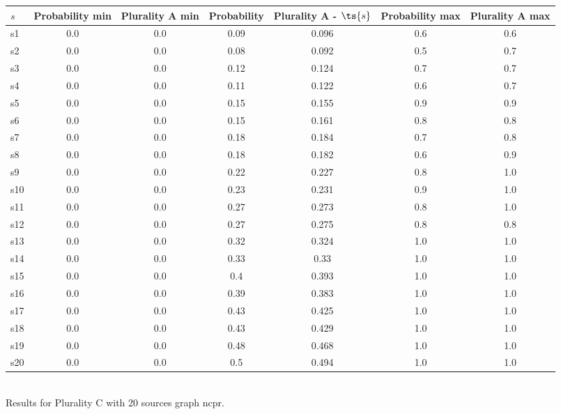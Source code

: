 \documentclass{article}
\begin{document}
\noindent\begin{tabular}{|l|c|c|c|c|c|c|}
\hline
$s$& Probability min & Plurality A min & Probability & Plurality A - $\ts{s}$ & Probability max & Plurality A max\\
\hline
s1 &0.0 & 0.0 & 0.09 & 0.096 & 0.6 & 0.6\\
\hline
s2 &0.0 & 0.0 & 0.08 & 0.092 & 0.5 & 0.7\\
\hline
s3 &0.0 & 0.0 & 0.12 & 0.124 & 0.7 & 0.7\\
\hline
s4 &0.0 & 0.0 & 0.11 & 0.122 & 0.6 & 0.7\\
\hline
s5 &0.0 & 0.0 & 0.15 & 0.155 & 0.9 & 0.9\\
\hline
s6 &0.0 & 0.0 & 0.15 & 0.161 & 0.8 & 0.8\\
\hline
s7 &0.0 & 0.0 & 0.18 & 0.184 & 0.7 & 0.8\\
\hline
s8 &0.0 & 0.0 & 0.18 & 0.182 & 0.6 & 0.9\\
\hline
s9 &0.0 & 0.0 & 0.22 & 0.227 & 0.8 & 1.0\\
\hline
s10 &0.0 & 0.0 & 0.23 & 0.231 & 0.9 & 1.0\\
\hline
s11 &0.0 & 0.0 & 0.27 & 0.273 & 0.8 & 1.0\\
\hline
s12 &0.0 & 0.0 & 0.27 & 0.275 & 0.8 & 0.8\\
\hline
s13 &0.0 & 0.0 & 0.32 & 0.324 & 1.0 & 1.0\\
\hline
s14 &0.0 & 0.0 & 0.33 & 0.33 & 1.0 & 1.0\\
\hline
s15 &0.0 & 0.0 & 0.4 & 0.393 & 1.0 & 1.0\\
\hline
s16 &0.0 & 0.0 & 0.39 & 0.383 & 1.0 & 1.0\\
\hline
s17 &0.0 & 0.0 & 0.43 & 0.425 & 1.0 & 1.0\\
\hline
s18 &0.0 & 0.0 & 0.43 & 0.429 & 1.0 & 1.0\\
\hline
s19 &0.0 & 0.0 & 0.48 & 0.468 & 1.0 & 1.0\\
\hline
s20 &0.0 & 0.0 & 0.5 & 0.494 & 1.0 & 1.0\\
\hline
\end{tabular}\\

\noindent Results for Plurality C with 20 sources graph ncpr.
\end{document}
